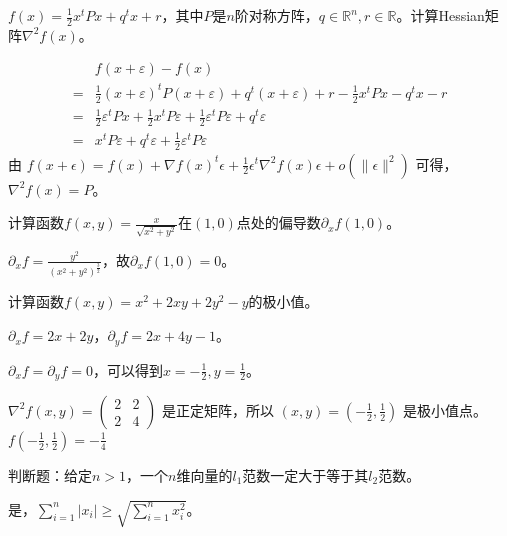 \begin{problem}
	$f(x)=\frac{1}{2}x^tPx+q^tx+r$，其中$P$是$n$阶对称方阵，$q\in\mathbb{R}^{n},r\in\mathbb{R}$。计算Hessian矩阵$\nabla^2 f(x)$。
\end{problem}
\begin{solution}
	$$\begin{aligned}
		&f(x+\varepsilon)-f(x)\\
		=&\frac{1}{2}(x+\varepsilon)^tP(x+\varepsilon)+q^t(x+\varepsilon)+r-\frac{1}{2}x^tPx-q^tx-r\\
		=&\frac{1}{2}\varepsilon^tPx+\frac{1}{2}x^tP\varepsilon+\frac{1}{2}\varepsilon^tP\varepsilon +q^t\varepsilon\\
		=&x^tP\varepsilon+q^t\varepsilon +\frac{1}{2}\varepsilon ^tP\varepsilon
	\end{aligned}$$
	由 $f(x + \epsilon) = f(x) + \nabla f(x)^t \epsilon + \frac{1}{2} \epsilon ^ t \nabla^2 f(x) \epsilon + o(\|\epsilon\|^2)$ 可得，$\nabla^2 f(x) = P$。
\end{solution}

\begin{problem}
	计算函数$f(x,y)=\frac{x}{\sqrt{x^2+y^2}}$在$(1,0)$点处的偏导数$\partial_xf(1,0)$。
\end{problem}
\begin{solution}
	$\partial_x f=\frac{y^2}{(x^2+y^2)^{\frac{3}{2}}}$，故$\partial_xf(1,0)=0$。
\end{solution}

\begin{problem}
	计算函数$f(x,y)=x^2+2xy+2y^2-y$的极小值。
\end{problem}
\begin{solution}
	$\partial_x f = 2x+2y$，$\partial_y f=2x+4y-1$。
	
	$\partial_x f = \partial_y f = 0$，可以得到$x=-\frac{1}{2},y=\frac{1}{2}$。

	$\nabla^2 f(x, y) = \begin{pmatrix}
		2 & 2\\
		2 & 4
	\end{pmatrix}$ 是正定矩阵，所以 $(x, y) = (-\frac{1}{2}, \frac{1}{2})$ 是极小值点。$f(-\frac{1}{2}, \frac{1}{2}) = -\frac{1}{4}$
\end{solution}

\begin{problem}
	判断题：给定$n>1$，一个$n$维向量的$l_1$范数一定大于等于其$l_2$范数。
\end{problem}
\begin{solution}
	是，$\sum_{i=1}^n|x_i|\ge \sqrt{\sum_{i=1}^nx_i^2}$。
\end{solution}



